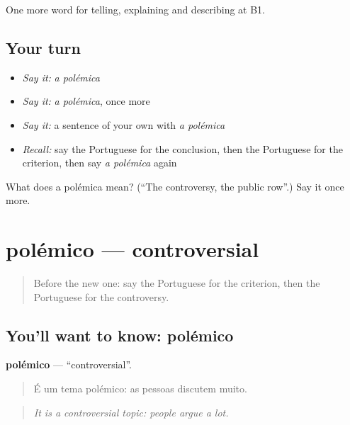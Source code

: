\begin{grammarlens}[title={What you've built}]
One more word for telling, explaining and describing at B1.
\end{grammarlens}

\subsection*{Your turn}
\begin{itemize}
\raggedright
  \item \emph{Say it:} \emph{a polémica}
  \item \emph{Say it:} \emph{a polémica}, once more
  \item \emph{Say it:} a sentence of your own with \emph{a polémica}
  \item \emph{Recall:} say the Portuguese for the conclusion, then the Portuguese for the criterion, then say \emph{a polémica} again
\end{itemize}

\begin{tcolorbox}[breakable,colback=teal!4,colframe=teal!35!black,title={Before you move on}]
What does a polémica mean? (\textquotedblleft{}The controversy, the public row\textquotedblright{}.) Say it once more.
\end{tcolorbox}
\section[polémico]{polémico — controversial}

\label{lesson:PT-C347-polemico}



\begin{quote}
Before the new one: say the Portuguese for the criterion, then the Portuguese for the controversy.
\end{quote}

\subsection*{You'll want to know: polémico}
\textbf{polémico} — \textquotedblleft{}controversial\textquotedblright{}.

\begin{quote}
É um tema polémico: as pessoas discutem muito.
\end{quote}

\begin{quote}
\emph{It is a controversial topic: people argue a lot.}
\end{quote}

